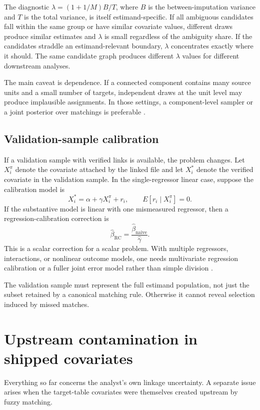 \documentclass[12pt]{article}
\theoremstyle{remark}
\begin{document}
The diagnostic $\lambda = (1+1/M)B/T$, where $B$ is the between-imputation variance and $T$ is the total variance, is itself estimand-specific. If all ambiguous candidates fall within the same group or have similar covariate values, different draws produce similar estimates and $\lambda$ is small regardless of the ambiguity share. If the candidates straddle an estimand-relevant boundary, $\lambda$ concentrates exactly where it should. The same candidate graph produces different $\lambda$ values for different downstream analyses.

The main caveat is dependence. If a connected component contains many source units and a small number of targets, independent draws at the unit level may produce implausible assignments. In those settings, a component-level sampler or a joint posterior over matchings is preferable \citep{tancredi2011,steorts2016}.

\subsection{Validation-sample calibration}

If a validation sample with verified links is available, the problem changes. Let $X_i^\pi$ denote the covariate attached by the linked file and let $X_i^*$ denote the verified covariate in the validation sample. In the single-regressor linear case, suppose the calibration model is
\[
X_i^*=\alpha+\gamma X_i^\pi+r_i,\qquad E[r_i\mid X_i^\pi]=0.
\]
If the substantive model is linear with one mismeasured regressor, then a regression-calibration correction is
\[
\hat\beta_{\mathrm{RC}}=\frac{\hat\beta_{\mathrm{naive}}}{\hat\gamma}.
\]
This is a scalar correction for a scalar problem. With multiple regressors, interactions, or nonlinear outcome models, one needs multivariate regression calibration or a fuller joint error model rather than simple division \citep{carroll2006}.

The validation sample must represent the full estimand population, not just the subset retained by a canonical matching rule. Otherwise it cannot reveal selection induced by missed matches.

\section{Upstream contamination in shipped covariates}

Everything so far concerns the analyst's own linkage uncertainty. A separate issue arises when the target-table covariates were themselves created upstream by fuzzy matching.
\end{document}

